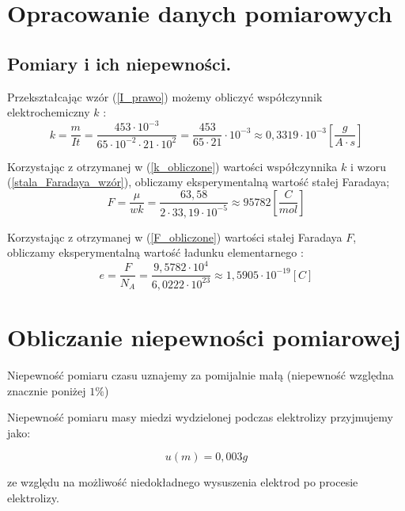 \documentclass [a4paper,11pt]{article}
\begin{document}
	
	\section{Opracowanie danych pomiarowych}\label{sec:opr}
	\subsection{Pomiary i ich niepewności.}
		

 	Przekształcając wzór (\ref{I_prawo}) możemy obliczyć współczynnik elektrochemiczny $k$ :
 	\begin{equation}
 	k = \frac{m}{I t} = \frac{453 \cdot 10^{-3}}{65 \cdot 10^{-2} \cdot 21 \cdot 10^2} = \frac{453}{65 \cdot 21} \cdot 10^{-3} \approx 0,3319 \cdot 10^{-3} \left[  \frac{g}{A \cdot s}\right] 
 	\label{k_obliczone} 
 	\end{equation}
 	
 	Korzystając z otrzymanej w (\ref{k_obliczone})  wartości współczynnika  $k$ i  wzoru (\ref{stala_Faradaya_wzór}),
 	obliczamy eksperymentalną wartość stałej Faradaya;
 	\begin{equation}
 	F = \frac{\mu}{w k} = \frac{63,58 }{2 \cdot 33,19 \cdot 10^{-5}} \approx 95782   \left[  \frac{C}{mol}\right] 
 	\label{F_obliczone} 
 	\end{equation}
 	
 	Korzystając z otrzymanej w (\ref{F_obliczone})  wartości stałej Faradaya  $F$, obliczamy eksperymentalną wartość ładunku elementarnego :
 	\begin{equation}
 	e = \frac{F}{N_A} = \frac{9,5782 \cdot 10^4}{6,0222 \cdot 10^{23}} \approx 1,5905 \cdot 10^{-19}   \left[  C \right] 
 	\label{e_obliczone} 
 	\end{equation}
 	
 	\section{Obliczanie niepewności pomiarowej}
 	Niepewność pomiaru czasu uznajemy za pomijalnie małą (niepewność względna znacznie poniżej $ 1 \% $)
 	
 	Niepewność pomiaru masy miedzi wydzielonej podczas elektrolizy przyjmujemy jako:
 	
 	\begin{equation*}
 	u(m) = 0,003 g
 	\end{equation*}
 	
 	ze względu na możliwość niedokładnego wysuszenia elektrod po procesie elektrolizy.
 	
\end{document}
